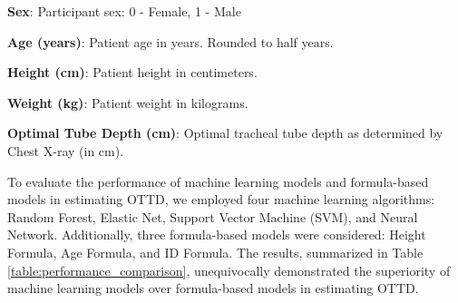 \documentclass[11pt]{article}
\begin{document}
\begin{table}[h]
\caption{Descriptive Statistics of Patient's Sex, Age, Height, Weight and Optimal Tracheal Tube Depth.}
\label{table:descriptive_statistics}
\begin{threeparttable}
\renewcommand{\TPTminimum}{\linewidth}
\begin{tablenotes}
\footnotesize
\item \textbf{Sex}: Participant sex: 0 - Female, 1 - Male
\item \textbf{Age (years)}: Patient age in years. Rounded to half years.
\item \textbf{Height (cm)}: Patient height in centimeters.
\item \textbf{Weight (kg)}: Patient weight in kilograms.
\item \textbf{Optimal Tube Depth (cm)}: Optimal tracheal tube depth as determined by Chest X-ray (in cm).
\end{tablenotes}
\end{threeparttable}
\end{table}


To evaluate the performance of machine learning models and formula-based models in estimating OTTD, we employed four machine learning algorithms: Random Forest, Elastic Net, Support Vector Machine (SVM), and Neural Network. Additionally, three formula-based models were considered: Height Formula, Age Formula, and ID Formula. The results, summarized in Table {}\ref{table:performance_comparison}, unequivocally demonstrated the superiority of machine learning models over formula-based models in estimating OTTD.
\end{document}
